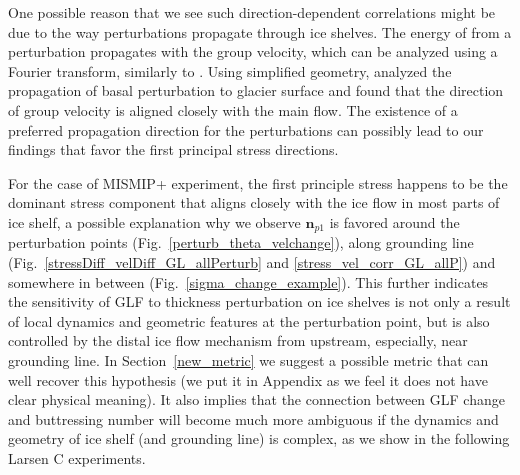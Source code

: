 \documentclass[tc, manuscript]{copernicus}
\begin{document}
One possible reason that we see such direction-dependent correlations might be due to the way perturbations propagate through ice shelves. The energy of from a perturbation propagates with the group velocity, which can be analyzed using a Fourier transform, similarly to \citet{gudmundsson2003}. Using simplified geometry, \citet{gudmundsson2003} analyzed the propagation of basal perturbation to glacier surface and found that the direction of group velocity is aligned closely with the main flow. The existence of a preferred propagation direction for the perturbations can possibly lead to our findings that favor the first principal stress directions. 

For the case of MISMIP+ experiment, the first principle stress happens to be the dominant stress component that aligns closely with the ice flow in most parts of ice shelf, a possible explanation why we observe $\mathbf{n}_{p1}$ is favored around the perturbation points (Fig.~\ref{perturb_theta_velchange}), along grounding line (Fig.~\ref{stressDiff_velDiff_GL_allPerturb} and \ref{stress_vel_corr_GL_allP}) and somewhere in between (Fig.~\ref{sigma_change_example}). This further indicates the sensitivity of GLF to thickness perturbation on ice shelves is not only a result of local dynamics and geometric features at the perturbation point, but is also controlled by the distal ice flow mechanism from upstream, especially, near grounding line. In Section~\ref{new_metric} we suggest a possible metric that can well recover this hypothesis (we put it in Appendix as we feel it does not have clear physical meaning). It also implies that the connection between GLF change and buttressing number will become much more ambiguous if the dynamics and geometry of ice shelf (and grounding line) is complex, as we show in the following Larsen C experiments.

\end{document}

